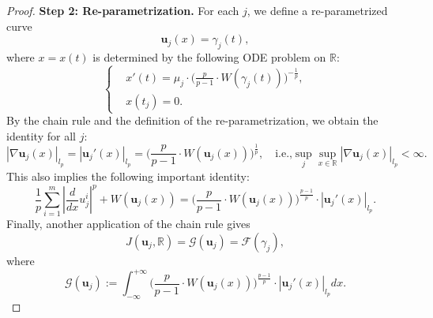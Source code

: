 \documentclass[11pt,twoside,reqno]{amsart}
\numberwithin{equation}{section}
\begin{document}
\begin{proof}
    \textbf{Step 2: Re-parametrization.} 
    For each $j$, we define a re-parametrized curve
\[
\mathbf{u}_j(x)=\gamma_j(t),
\]
where $x=x(t)$ is determined by the following ODE problem on $\mathbb{R}$:
    \begin{equation*}
        \left\{\begin{aligned}
            &x'(t)=\mu_{j}\cdot\Big(\frac{p}{p-1}\cdot W(\gamma_{j}(t))\Big)^{-\frac{1}{p}},\\
            &x(t_{j})=0.
        \end{aligned}\right.
    \end{equation*}
    By the chain rule and the definition of the re-parametrization, we obtain
the identity  for all $j$:
    \begin{equation*}
        |\nabla\mathbf{u}_{j}(x)|_{l_{p}}=|\mathbf{u}_{j}'(x)|_{l_{p}}=\Big(\frac{p}{p-1}\cdot W(\mathbf{u}_{j}(x))\Big)^{\frac{1}{p}},\quad\mbox{i.e.,}\sup_{j}\sup_{x\in\mathbb{R}}|\nabla\mathbf{u}_{j}(x)|_{l_{p}}<\infty.
    \end{equation*}
    This also implies the following important identity:
    \begin{equation}\label{eq. speed identity for the sequence}
        \frac{1}{p}\sum_{i=1}^{m}|\frac{d}{dx}u_{j}^{i}|^{p}+W(\mathbf{u}_{j}(x))=\Big(\frac{p}{p-1}\cdot W(\mathbf{u}_{j}(x))\Big)^{\frac{p-1}{p}}\cdot|\mathbf{u}_{j}'(x)|_{l_{p}}.
    \end{equation}
   Finally, another application of the chain rule gives 
    \begin{equation*}
        J(\mathbf{u}_{j},\mathbb{R})=\mathcal{G}(\mathbf{u}_{j})=\mathcal{F}(\gamma_{j}),
    \end{equation*}
    where
    \begin{equation*}
        \mathcal{G}(\mathbf{u}_{j}):=\int_{-\infty}^{+\infty}\Big(\frac{p}{p-1}\cdot W(\mathbf{u}_{j}(x))\Big)^{\frac{p-1}{p}}\cdot|\mathbf{u}_{j}'(x)|_{l_{p}}dx.
    \end{equation*}


\end{proof}
\end{document}
